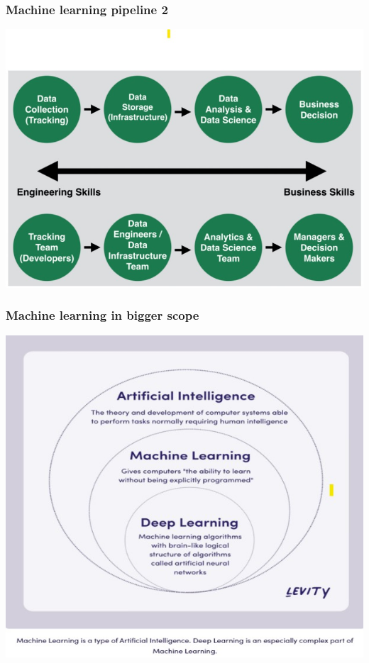 \documentclass{beamer}
\begin{document}
\begin{frame}
    \frametitle{Machine learning pipeline 2}
    \begin{center}
        \includegraphics[scale=0.5]{figures/ML_pipe_2.jpg}
    \end{center}
\end{frame}

\begin{frame}
    \frametitle{Machine learning in bigger scope}
    \begin{center}
        \includegraphics[scale=0.5]{figures/ml_in_ai.jpg}
    \end{center}
\end{frame}
\end{document}
